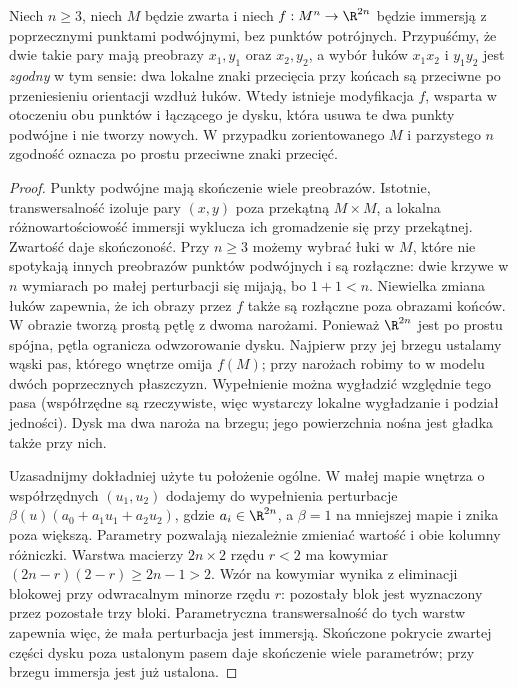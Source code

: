 \begin{stwierdzenie}
\label{lem:dysk-whitneya-15}
Niech $n\geq3$, niech $M$ będzie zwarta i niech
$f:M^n\to\R^{2n}$ będzie immersją z poprzecznymi punktami
podwójnymi, bez punktów potrójnych.
Przypuśćmy, że dwie takie pary mają
preobrazy $x_1,y_1$ oraz $x_2,y_2$,
a wybór łuków $x_1x_2$ i $y_1y_2$
jest \emph{zgodny} w tym sensie:
dwa lokalne znaki przecięcia przy końcach
są przeciwne po przeniesieniu orientacji
wzdłuż łuków. Wtedy istnieje modyfikacja
$f$, wsparta w otoczeniu obu punktów
i łączącego je dysku, która usuwa
te dwa punkty podwójne i nie tworzy nowych.
W przypadku zorientowanego $M$ i parzystego
$n$ zgodność oznacza po prostu przeciwne
znaki przecięć.
\end{stwierdzenie}
\begin{proof}
Punkty podwójne mają skończenie wiele preobrazów.
Istotnie, transwersalność izoluje pary $(x,y)$ poza
przekątną $M\times M$, a lokalna różnowartościowość
immersji wyklucza ich gromadzenie się przy przekątnej.
Zwartość daje skończoność.
Przy $n\geq3$ możemy wybrać łuki w $M$,
które nie spotykają innych preobrazów
punktów podwójnych i są rozłączne:
dwie krzywe w $n$ wymiarach po małej perturbacji
się mijają, bo $1+1<n$. Niewielka
zmiana łuków zapewnia, że ich obrazy
przez $f$ także są rozłączne poza
obrazami końców. W obrazie tworzą
prostą pętlę z dwoma narożami.
Ponieważ $\R^{2n}$ jest po prostu spójna,
pętla ogranicza odwzorowanie dysku. Najpierw przy
jej brzegu ustalamy wąski pas, którego wnętrze
omija $f(M)$; przy narożach robimy to w modelu
dwóch poprzecznych płaszczyzn. Wypełnienie można
wygładzić względnie tego pasa (współrzędne są
rzeczywiste, więc wystarczy lokalne wygładzanie
i podział jedności). Dysk ma dwa naroża na brzegu;
jego powierzchnia nośna jest gładka także przy nich.

Uzasadnijmy dokładniej użyte tu położenie ogólne.
W małej mapie wnętrza o współrzędnych $(u_1,u_2)$
dodajemy do wypełnienia perturbacje
$\beta(u)(a_0+a_1u_1+a_2u_2)$, gdzie $a_i\in\R^{2n}$,
a $\beta=1$ na mniejszej mapie i znika poza większą.
Parametry pozwalają niezależnie zmieniać wartość
i obie kolumny różniczki. Warstwa macierzy
$2n\times2$ rzędu $r<2$ ma kowymiar
$(2n-r)(2-r)\geq2n-1>2$. Wzór na kowymiar wynika
z eliminacji blokowej przy odwracalnym minorze
rzędu $r$: pozostały blok jest wyznaczony przez
pozostałe trzy bloki. Parametryczna transwersalność
do tych warstw zapewnia więc, że mała perturbacja
jest immersją. Skończone pokrycie zwartej części
dysku poza ustalonym pasem daje skończenie wiele
parametrów; przy brzegu immersja jest już ustalona.


\end{proof}
